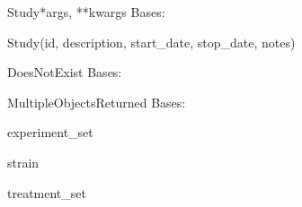 \documentclass[letterpaper,10pt,english]{sphinxmanual}
\begin{document}
\hypertarget{data.models.Study}{}\begin{classdesc}{Study}{*args, **kwargs}
Bases: 

Study(id, description, start\_date, stop\_date, notes)

\hypertarget{data.models.Study.DoesNotExist}{}\begin{excdesc}{DoesNotExist}
Bases: 
\end{excdesc}

\hypertarget{data.models.Study.MultipleObjectsReturned}{}\begin{excdesc}{MultipleObjectsReturned}
Bases: 
\end{excdesc}

\hypertarget{data.models.Study.experiment\_set}{}\begin{memberdesc}[Study]{experiment\_set}\end{memberdesc}

\hypertarget{data.models.Study.strain}{}\begin{memberdesc}[Study]{strain}\end{memberdesc}

\hypertarget{data.models.Study.treatment\_set}{}\begin{memberdesc}[Study]{treatment\_set}\end{memberdesc}
\end{classdesc}
\end{document}
